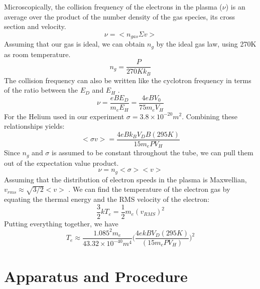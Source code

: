 \documentclass{sigchi}
\begin{document}
Microscopically, the collision frequency of the electrons in the plasma ($\nu$) is an average over the product of the number density of the gas species, its cross section and velocity. 
\begin{equation}
\nu = <n_{gas}\Sigma v>
\end{equation}
Assuming that our gas is ideal, we can obtain $n_g$ by the ideal gas law, using 270K as room temperature.
\begin{equation}
n_g  = \frac{P}{270K k_B}
\end{equation}
The collision frequency can also be written like the cyclotron frequency in terms of the ratio between the $E_D$ and $E_H$ \cite{plasma_param}.
\begin{equation}
\nu = \frac{eBE_D}{m_eE_H} = \frac{4eBV_0}{75 m_e V_H}
\end{equation}
For the Helium used in our experiment $\sigma = 3.8\times10^{-20} m^2$. Combining these relationships yields: 
\begin{equation}
<\sigma v> = \frac{4eBk_B V_D B (295K)}{15 m_e P V_H}
\end{equation}
Since $n_g$ and $\sigma$ is assumed to be constant throughout the tube, we can pull them out of the expectation value product. \begin{equation}
\nu  = n_g <\sigma> <v> 
\end{equation} Assuming that the distribution of electron speeds in the plasma is Maxwellian, $v_{rms} \approx \sqrt{3/2} <v>$ \cite{maxwell}. We can find the temperature of the electron gas by equating the thermal energy and the RMS velocity of the electron: 
\begin{equation}
\frac{3}{2}kT_e = \frac{1}{2} m_e (v_{RMS})^2
\end{equation} 
Putting everything together, we have 
\begin{equation}
T_e  \approx \frac{1.085^2 m_e}{43.32\times10^{-40}m^4}\Big(\frac{4ekBV_D (295K)}{(15 m_e P V_H)}\Big)^2
\label{Te}
\end{equation}
\section{Apparatus and Procedure}\label{sec:ap}
\end{document}
